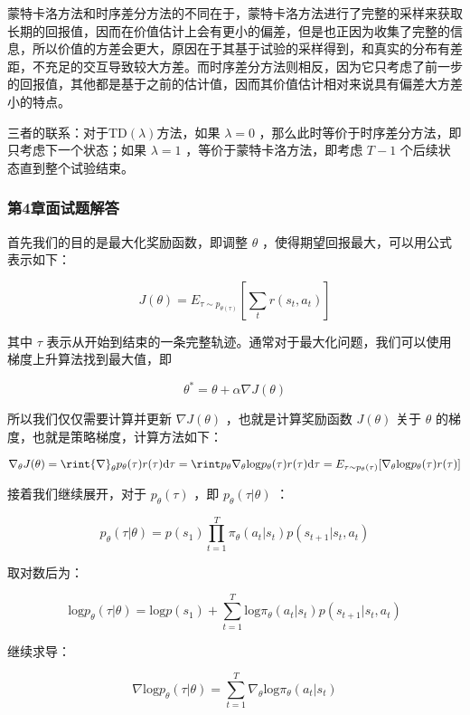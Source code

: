 蒙特卡洛方法和时序差分方法的不同在于，蒙特卡洛方法进行了完整的采样来获取长期的回报值，因而在价值估计上会有更小的偏差，但是也正因为收集了完整的信息，所以价值的方差会更大，原因在于其基于试验的采样得到，和真实的分布有差距，不充足的交互导致较大方差。而时序差分方法则相反，因为它只考虑了前一步的回报值，其他都是基于之前的估计值，因而其价值估计相对来说具有偏差大方差小的特点。

三者的联系：对于TD$(\lambda)$方法，如果 $\lambda = 0$ ，那么此时等价于时序差分方法，即只考虑下一个状态；如果 $ \lambda = 1$ ，等价于蒙特卡洛方法，即考虑 $T-1$ 个后续状态直到整个试验结束。



\subsubsection*{第4章面试题解答}


首先我们的目的是最大化奖励函数，即调整 $\theta$ ，使得期望回报最大，可以用公式表示如下：

$$
J(\theta)=E_{\tau \sim p_{\theta(\tau)}}\left[\sum_tr(s_t,a_t)\right]
$$

其中 $\tau$ 表示从开始到结束的一条完整轨迹。通常对于最大化问题，我们可以使用梯度上升算法找到最大值，即

$$
\theta^* = \theta + \alpha\nabla J({\theta})
$$

所以我们仅仅需要计算并更新 $\nabla J({\theta})$ ，也就是计算奖励函数 $J({\theta})$ 关于 $\theta$ 的梯度，也就是策略梯度，计算方法如下：

$$
\nabla_{\theta}J(\theta) = \rint {\nabla}_{\theta}p_{\theta}(\tau)r(\tau) \mathrm{d}{\tau}=\rint p_{\theta}{\nabla}_{\theta} \mathrm{log}p_{\theta}(\tau)r(\tau)\mathrm{d}{\tau}=E_{\tau \sim p_{\theta}(\tau)}[{\nabla}_{\theta}\mathrm{log}p_{\theta}(\tau)r(\tau)]
$$

接着我们继续展开，对于 $p_{\theta}(\tau)$ ，即 $p_{\theta}(\tau|{\theta})$ ：

$$
p_{\theta}(\tau|{\theta}) = p(s_1)\prod_{t=1}^T \pi_{\theta}(a_t|s_t)p(s_{t+1}|s_t,a_t)
$$

取对数后为：

$$
\mathrm{log}p_{\theta}(\tau|{\theta}) = \mathrm{log}p(s_1)+\sum_{t=1}^T \mathrm{log}\pi_{\theta}(a_t|s_t)p(s_{t+1}|s_t,a_t)
$$

继续求导：

$$
\nabla \mathrm{log}p_{\theta}(\tau|{\theta}) = \sum_{t=1}^T \nabla_{\theta}\mathrm{log} \pi_{\theta}(a_t|s_t)
$$


